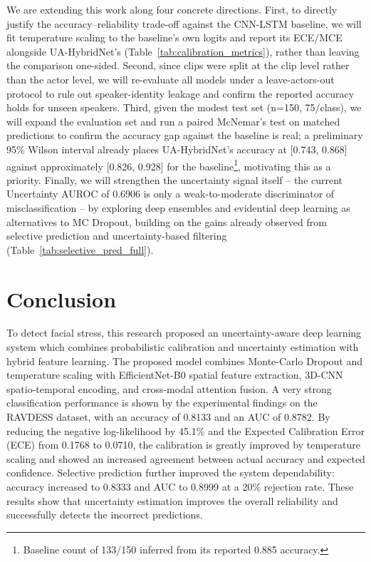 \documentclass[conference]{IEEEtran}
\begin{document}
We are extending this work along four concrete directions. First, to directly justify the accuracy--reliability trade-off against the CNN-LSTM baseline, we will fit temperature scaling to the baseline's own logits and report its ECE/MCE alongside UA-HybridNet's (Table~\ref{tab:calibration_metrics}), rather than leaving the comparison one-sided. Second, since clips were split at the clip level rather than the actor level, we will re-evaluate all models under a leave-actors-out protocol to rule out speaker-identity leakage and confirm the reported accuracy holds for unseen speakers. Third, given the modest test set (n=150, 75/class), we will expand the evaluation set and run a paired McNemar's test on matched predictions to confirm the accuracy gap against the baseline is real; a preliminary 95\% Wilson interval already places UA-HybridNet's accuracy at [0.743, 0.868] against approximately [0.826, 0.928] for the baseline\footnote{Baseline count of 133/150 inferred from its reported 0.885 accuracy.}, motivating this as a priority. Finally, we will strengthen the uncertainty signal itself -- the current Uncertainty AUROC of 0.6906 is only a weak-to-moderate discriminator of misclassification -- by exploring deep ensembles and evidential deep learning as alternatives to MC Dropout, building on the gains already observed from selective prediction and uncertainty-based filtering (Table~\ref{tab:selective_pred_full}).

\section{Conclusion}


To detect facial stress, this research proposed an uncertainty-aware deep learning system which combines probabilistic calibration and uncertainty estimation with hybrid feature learning. The proposed model combines Monte-Carlo Dropout and temperature scaling with EfficientNet-B0 spatial feature extraction, 3D-CNN spatio-temporal encoding, and cross-modal attention fusion. A very strong classification performance is shown by the experimental findings on the RAVDESS dataset, with an accuracy of 0.8133 and an AUC of 0.8782. By reducing the negative log-likelihood by 45.1\% and the Expected Calibration Error (ECE) from 0.1768 to 0.0710, the calibration is greatly improved by temperature scaling and showed an increased agreement between actual accuracy and expected confidence.
Selective prediction further improved the system dependability: accuracy increased to 0.8333 and AUC to 0.8999 at a 20\% rejection rate. These results show that uncertainty estimation improves the overall reliability and successfully detects the incorrect predictions. 
\end{document}
